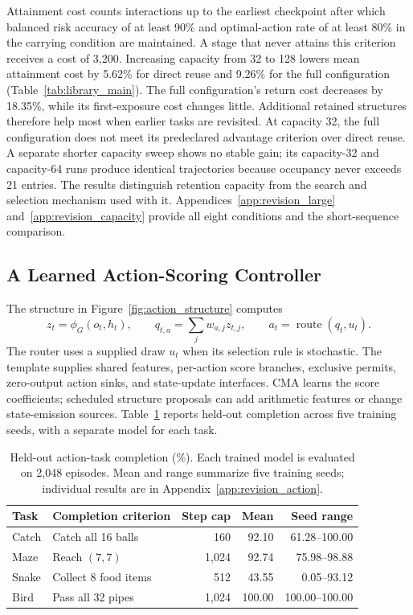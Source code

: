 Attainment cost counts interactions up to the earliest checkpoint after which balanced risk accuracy of at least 90\% and optimal-action rate of at least 80\% in the carrying condition are maintained. A stage that never attains this criterion receives a cost of 3,200. Increasing capacity from 32 to 128 lowers mean attainment cost by 5.62\% for direct reuse and 9.26\% for the full configuration (Table~\ref{tab:library_main}). The full configuration's return cost decreases by 18.35\%, while its first-exposure cost changes little. Additional retained structures therefore help most when earlier tasks are revisited. At capacity 32, the full configuration does not meet its predeclared advantage criterion over direct reuse. A separate shorter capacity sweep shows no stable gain; its capacity-32 and capacity-64 runs produce identical trajectories because occupancy never exceeds 21 entries. The results distinguish retention capacity from the search and selection mechanism used with it. Appendices~\ref{app:revision_large} and~\ref{app:revision_capacity} provide all eight conditions and the short-sequence comparison.

\subsection{A Learned Action-Scoring Controller}
The structure in Figure~\ref{fig:action_structure} computes
\begin{equation}
z_t=\phi_G(o_t,h_t),\qquad q_{t,a}=\sum_j w_{a,j}z_{t,j},\qquad
a_t=\operatorname{route}(q_t,u_t).
\end{equation}
The router uses a supplied draw $u_t$ when its selection rule is stochastic. The template supplies shared features, per-action score branches, exclusive permits, zero-output action sinks, and state-update interfaces. CMA learns the score coefficients; scheduled structure proposals can add arithmetic features or change state-emission sources. Table~\ref{tab:action_main} reports held-out completion across five training seeds, with a separate model for each task.

\begin{table}[tb]
\centering\small
\caption{Held-out action-task completion (\%). Each trained model is evaluated on 2,048 episodes. Mean and range summarize five training seeds; individual results are in Appendix~\ref{app:revision_action}.}
\label{tab:action_main}
\begin{tabular}{llrrr}
\toprule
Task & Completion criterion & Step cap & Mean & Seed range \\
\midrule
Catch & Catch all 16 balls & 160 & 92.10 & 61.28--100.00 \\
Maze & Reach $(7,7)$ & 1,024 & 92.74 & 75.98--98.88 \\
Snake & Collect 8 food items & 512 & 43.55 & 0.05--93.12 \\
Bird & Pass all 32 pipes & 1,024 & 100.00 & 100.00--100.00 \\
\bottomrule
\end{tabular}
\end{table}

